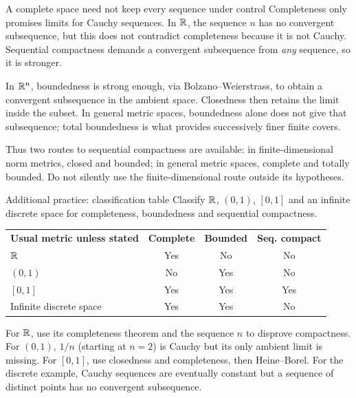 \begin{note}{A complete space need not keep every sequence under control}
Completeness only promises limits for Cauchy sequences. In $\mathbb R$, the sequence $n$ has no convergent subsequence, but this does not contradict completeness because it is not Cauchy. Sequential compactness demands a convergent subsequence from \emph{any} sequence, so it is stronger.

In $\mathbb R^n$, boundedness is strong enough, via Bolzano--Weierstrass, to obtain a convergent subsequence in the ambient space. Closedness then retains the limit inside the subset. In general metric spaces, boundedness alone does not give that subsequence; total boundedness is what provides successively finer finite covers.

Thus two routes to sequential compactness are available: in finite-dimensional norm metrics, closed and bounded; in general metric spaces, complete and totally bounded. Do not silently use the finite-dimensional route outside its hypotheses.
\end{note}
\begin{exam}{Additional practice: classification table}
Classify $\mathbb R$, $(0,1)$, $[0,1]$ and an infinite discrete space for completeness, boundedness and sequential compactness.
\end{exam}
\begin{answer}
\begin{tabular}{p{.32\linewidth}ccc}
\textbf{Usual metric unless stated} & \textbf{Complete} & \textbf{Bounded} & \textbf{Seq. compact}\\[4pt]
$\mathbb R$ & Yes & No & No\\[3pt]
$(0,1)$ & No & Yes & No\\[3pt]
$[0,1]$ & Yes & Yes & Yes\\[3pt]
Infinite discrete space & Yes & Yes & No
\end{tabular}

For $\mathbb R$, use its completeness theorem and the sequence $n$ to disprove compactness. For $(0,1)$, $1/n$ (starting at $n=2$) is Cauchy but its only ambient limit is missing. For $[0,1]$, use closedness and completeness, then Heine--Borel. For the discrete example, Cauchy sequences are eventually constant but a sequence of distinct points has no convergent subsequence.
\end{answer}


